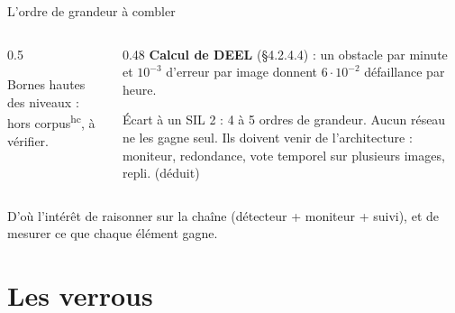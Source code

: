 \documentclass[aspectratio=169,11pt]{beamer}
\newcommand{\hc}{\textsuperscript{\color{gray}hc}}
\begin{document}
{\shorthandoff{;}
\begin{frame}{L'ordre de grandeur à combler}
  \begin{columns}[c]
    \begin{column}{0.5\textwidth}

      {\tiny\color{gray} Bornes hautes des niveaux : hors corpus\hc, à vérifier.}
    \end{column}
    \begin{column}{0.48\textwidth}
      \small
      \textbf{Calcul de DEEL} (§4.2.4.4) : un obstacle par minute et $10^{-3}$ d'erreur par
      image donnent $6\cdot10^{-2}$ défaillance par heure.

      \vspace{0.4em}
      Écart à un SIL 2 : \alert{4 à 5 ordres de grandeur}. Aucun réseau ne les gagne seul.
      Ils doivent venir de l'architecture : moniteur, redondance, vote temporel sur plusieurs
      images, repli. {\scriptsize\color{acc}(déduit)}
    \end{column}
  \end{columns}

  \vspace{0.4em}
  \small
  D'où l'intérêt de raisonner sur la \alert{chaîne} (détecteur + moniteur + suivi), et de
  mesurer ce que chaque élément gagne.
\end{frame}}

\section{Les verrous}
\end{document}
